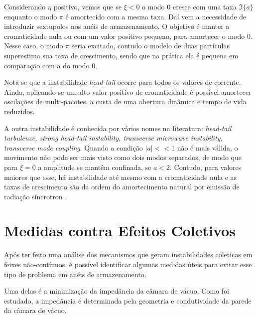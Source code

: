 Considerando $\eta$ positivo, vemos que se $\xi<0$ o modo 0 cresce com uma taxa $\Im\{a\}$ enquanto o modo $\pi$ é amortecido com a mesma taxa. Daí vem a necessidade de introduzir sextupolos nos anéis de armazenamento. O objetivo é manter a cromaticidade nula ou com um valor positivo pequeno, para amortecer o modo 0. Nesse caso, o modo $\pi$ seria excitado, contudo o modelo de duas partículas superestima sua taxa de crescimento, sendo que na prática ela é pequena em comparação com a do modo 0.

Nota-se que a instabilidade \textit{head-tail} ocorre para todos os valores de corrente. Ainda, aplicando-se um alto valor positivo de cromaticidade é possível amortecer oscilações de multi-pacotes, a custa de uma abertura dinâmica e tempo de vida reduzidos.

A outra instabilidade é conhecida por vários nomes na literatura:  \textit{head-tail turbulence, strong head-tail instability, transverse microwave instability, transverse mode coupling}. Quando a condição $|a| << 1$ não é mais válida, o movimento não pode ser mais visto como dois modos separados, de modo que para $\xi = 0$ a amplitude se mantém confinada, se $a<2$. Contudo, para valores maiores que esse, há instabilidade até mesmo com a cromaticidade nula e as taxas de crescimento são da ordem do amortecimento natural por emissão de radiação síncrotron \cite{Khan}.

\section{Medidas contra Efeitos Coletivos}

Após ter feito uma análise dos mecanismos que geram instabilidades coleticas em feixes não-contínuos, é possível identificar algumas medidas úteis para evitar esse tipo de problema em anéis de armazenamento.

Uma delas é a minimização da impedância da câmara de vácuo. Como foi estudado, a impedância é determinada pela geometria e condutividade da parede da câmara de vácuo. 

